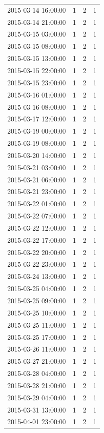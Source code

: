 \begin{tabular}{lrrr}
2015-03-14 16:00:00 & 1 & 2 & 1 \\
2015-03-14 21:00:00 & 1 & 2 & 1 \\
2015-03-15 03:00:00 & 1 & 2 & 1 \\
2015-03-15 08:00:00 & 1 & 2 & 1 \\
2015-03-15 13:00:00 & 1 & 2 & 1 \\
2015-03-15 22:00:00 & 1 & 2 & 1 \\
2015-03-15 23:00:00 & 1 & 2 & 1 \\
2015-03-16 01:00:00 & 1 & 2 & 1 \\
2015-03-16 08:00:00 & 1 & 2 & 1 \\
2015-03-17 12:00:00 & 1 & 2 & 1 \\
2015-03-19 00:00:00 & 1 & 2 & 1 \\
2015-03-19 08:00:00 & 1 & 2 & 1 \\
2015-03-20 14:00:00 & 1 & 2 & 1 \\
2015-03-21 03:00:00 & 1 & 2 & 1 \\
2015-03-21 06:00:00 & 1 & 2 & 1 \\
2015-03-21 23:00:00 & 1 & 2 & 1 \\
2015-03-22 01:00:00 & 1 & 2 & 1 \\
2015-03-22 07:00:00 & 1 & 2 & 1 \\
2015-03-22 12:00:00 & 1 & 2 & 1 \\
2015-03-22 17:00:00 & 1 & 2 & 1 \\
2015-03-22 20:00:00 & 1 & 2 & 1 \\
2015-03-22 23:00:00 & 1 & 2 & 1 \\
2015-03-24 13:00:00 & 1 & 2 & 1 \\
2015-03-25 04:00:00 & 1 & 2 & 1 \\
2015-03-25 09:00:00 & 1 & 2 & 1 \\
2015-03-25 10:00:00 & 1 & 2 & 1 \\
2015-03-25 11:00:00 & 1 & 2 & 1 \\
2015-03-25 17:00:00 & 1 & 2 & 1 \\
2015-03-26 11:00:00 & 1 & 2 & 1 \\
2015-03-27 21:00:00 & 1 & 2 & 1 \\
2015-03-28 04:00:00 & 1 & 2 & 1 \\
2015-03-28 21:00:00 & 1 & 2 & 1 \\
2015-03-29 04:00:00 & 1 & 2 & 1 \\
2015-03-31 13:00:00 & 1 & 2 & 1 \\
2015-04-01 23:00:00 & 1 & 2 & 1 \\

\end{tabular}
